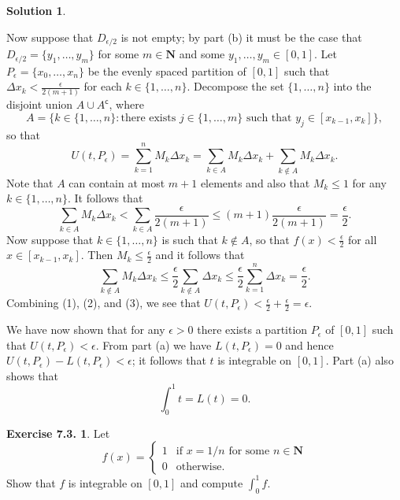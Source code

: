 \documentclass[12pt]{article}
\theoremstyle{definition}
\theoremstyle{exercise}
\newtheorem{exercise}{Exercise 7.3.}
\theoremstyle{solution}
\newtheorem*{solution}{Solution}
\newcommand{\setcomp}[1]{#1^{\mathsf{c}}}
\newcommand{\N}{\mathbf{N}}
\begin{document}
\begin{solution}
\begin{enumerate}
        Now suppose that \( D_{\epsilon/2} \) is not empty; by part (b) it must be the case that \( D_{\epsilon/2} = \{ y_1, \ldots, y_m \} \) for some \( m \in \N \) and some \( y_1, \ldots, y_m \in [0, 1] \). Let \( P_{\epsilon} = \{ x_0, \ldots, x_n \} \) be the evenly spaced partition of \( [0, 1] \) such that \( \Delta x_k < \tfrac{\epsilon}{2(m+1)} \) for each \( k \in \{ 1, \ldots, n \} \). Decompose the set \( \{ 1, \ldots, n \} \) into the disjoint union \( A \cup \setcomp{A} \), where
        \[
            A = \{ k \in \{ 1, \ldots, n \} : \text{there exists } j \in \{ 1, \ldots, m \} \text{ such that } y_j \in [x_{k-1}, x_k] \},
        \]
        so that
        \[
            U(t, P_{\epsilon}) = \sum_{k=1}^n M_k \Delta x_k = \sum_{k \in A} M_k \Delta x_k + \sum_{k \not\in A} M_k \Delta x_k. \tag{1}
        \]
        Note that \( A \) can contain at most \( m + 1 \) elements and also that \( M_k \leq 1 \) for any \( k \in \{ 1, \ldots, n \} \). It follows that
        \[
            \sum_{k \in A} M_k \Delta x_k < \sum_{k \in A} \frac{\epsilon}{2(m + 1)} \leq (m + 1) \frac{\epsilon}{2(m + 1)} = \frac{\epsilon}{2}. \tag{2}
        \]
        Now suppose that \( k \in \{ 1, \ldots, n \} \) is such that \( k \not\in A \), so that \( f(x) < \tfrac{\epsilon}{2} \) for all \( x \in [x_{k-1}, x_k] \). Then \( M_k \leq \tfrac{\epsilon}{2} \) and it follows that
        \[
            \sum_{k \not\in A} M_k \Delta x_k \leq \frac{\epsilon}{2} \sum_{k \not\in A} \Delta x_k \leq \frac{\epsilon}{2} \sum_{k=1}^n \Delta x_k = \frac{\epsilon}{2}. \tag{3}
        \]
        Combining (1), (2), and (3), we see that \( U(t, P_{\epsilon}) < \tfrac{\epsilon}{2} + \tfrac{\epsilon}{2} = \epsilon \). 

        We have now shown that for any \( \epsilon > 0 \) there exists a partition \( P_{\epsilon} \) of \( [0, 1] \) such that \( U(t, P_{\epsilon}) < \epsilon \). From part (a) we have \( L(t, P_{\epsilon}) = 0 \) and hence \( U(t, P_{\epsilon}) - L(t, P_{\epsilon}) < \epsilon \); it follows that \( t \) is integrable on \( [0, 1] \). Part (a) also shows that
        \[
            \int_0^1 t = L(t) = 0.
        \]
    \end{enumerate}
\end{solution}

\begin{exercise}
\label{ex:3}
    Let
    \[
        f(x) = \begin{cases}
            1 & \text{if } x = 1/n \text{ for some } n \in \N \\
            0 & \text{otherwise}. 
        \end{cases}
    \]
    Show that \( f \) is integrable on \( [0, 1] \) and compute \( \int_0^1 f \).
\end{exercise}
\end{document}
